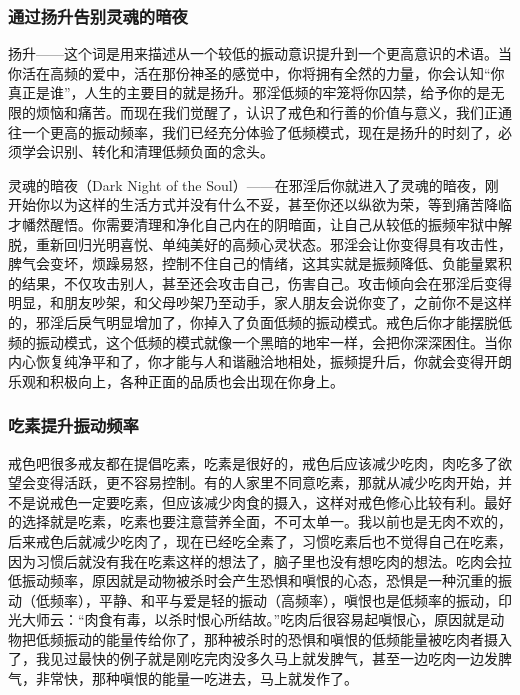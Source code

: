 \subsubsection{通过扬升告别灵魂的暗夜}

扬升——这个词是用来描述从一个较低的振动意识提升到一个更高意识的术语。当你活在高频的爱中，活在那份神圣的感觉中，你将拥有全然的力量，你会认知“你真正是谁”，人生的主要目的就是扬升。邪淫低频的牢笼将你囚禁，给予你的是无限的烦恼和痛苦。而现在我们觉醒了，认识了戒色和行善的价值与意义，我们正通往一个更高的振动频率，我们已经充分体验了低频模式，现在是扬升的时刻了，必须学会识别、转化和清理低频负面的念头。

灵魂的暗夜（Dark Night of the Soul）——在邪淫后你就进入了灵魂的暗夜，刚开始你以为这样的生活方式并没有什么不妥，甚至你还以纵欲为荣，等到痛苦降临才幡然醒悟。你需要清理和净化自己内在的阴暗面，让自己从较低的振频牢狱中解脱，重新回归光明喜悦、单纯美好的高频心灵状态。邪淫会让你变得具有攻击性，脾气会变坏，烦躁易怒，控制不住自己的情绪，这其实就是振频降低、负能量累积的结果，不仅攻击别人，甚至还会攻击自己，伤害自己。攻击倾向会在邪淫后变得明显，和朋友吵架，和父母吵架乃至动手，家人朋友会说你变了，之前你不是这样的，邪淫后戾气明显增加了，你掉入了负面低频的振动模式。戒色后你才能摆脱低频的振动模式，这个低频的模式就像一个黑暗的地牢一样，会把你深深困住。当你内心恢复纯净平和了，你才能与人和谐融洽地相处，振频提升后，你就会变得开朗乐观和积极向上，各种正面的品质也会出现在你身上。

\subsubsection{吃素提升振动频率}

戒色吧很多戒友都在提倡吃素，吃素是很好的，戒色后应该减少吃肉，肉吃多了欲望会变得活跃，更不容易控制。有的人家里不同意吃素，那就从减少吃肉开始，并不是说戒色一定要吃素，但应该减少肉食的摄入，这样对戒色修心比较有利。最好的选择就是吃素，吃素也要注意营养全面，不可太单一。我以前也是无肉不欢的，后来戒色后就减少吃肉了，现在已经吃全素了，习惯吃素后也不觉得自己在吃素，因为习惯后就没有我在吃素这样的想法了，脑子里也没有想吃肉的想法。吃肉会拉低振动频率，原因就是动物被杀时会产生恐惧和嗔恨的心态，恐惧是一种沉重的振动（低频率），平静、和平与爱是轻的振动（高频率），嗔恨也是低频率的振动，印光大师云：“肉食有毒，以杀时恨心所结故。”吃肉后很容易起嗔恨心，原因就是动物把低频振动的能量传给你了，那种被杀时的恐惧和嗔恨的低频能量被吃肉者摄入了，我见过最快的例子就是刚吃完肉没多久马上就发脾气，甚至一边吃肉一边发脾气，非常快，那种嗔恨的能量一吃进去，马上就发作了。

